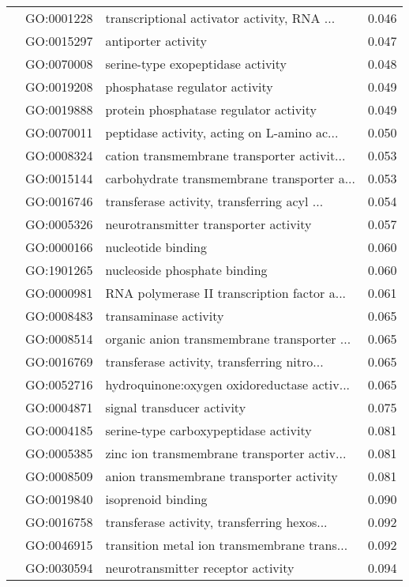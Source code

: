 \begin{longtable}{lllr}
   & GO:0001228 &  transcriptional activator activity, RNA ... &         0.046 \\
   & GO:0015297 &                          antiporter activity &         0.047 \\
   & GO:0070008 &            serine-type exopeptidase activity &         0.048 \\
   & GO:0019208 &               phosphatase regulator activity &         0.049 \\
   & GO:0019888 &       protein phosphatase regulator activity &         0.049 \\
   & GO:0070011 &  peptidase activity, acting on L-amino ac... &         0.050 \\
   & GO:0008324 &  cation transmembrane transporter activit... &         0.053 \\
   & GO:0015144 &  carbohydrate transmembrane transporter a... &         0.053 \\
   & GO:0016746 &  transferase activity, transferring acyl ... &         0.054 \\
   & GO:0005326 &        neurotransmitter transporter activity &         0.057 \\
   & GO:0000166 &                           nucleotide binding &         0.060 \\
   & GO:1901265 &                 nucleoside phosphate binding &         0.060 \\
   & GO:0000981 &  RNA polymerase II transcription factor a... &         0.061 \\
   & GO:0008483 &                        transaminase activity &         0.065 \\
   & GO:0008514 &  organic anion transmembrane transporter ... &         0.065 \\
   & GO:0016769 &  transferase activity, transferring nitro... &         0.065 \\
   & GO:0052716 &  hydroquinone:oxygen oxidoreductase activ... &         0.065 \\
   & GO:0004871 &                   signal transducer activity &         0.075 \\
   & GO:0004185 &        serine-type carboxypeptidase activity &         0.081 \\
   & GO:0005385 &  zinc ion transmembrane transporter activ... &         0.081 \\
   & GO:0008509 &     anion transmembrane transporter activity &         0.081 \\
   & GO:0019840 &                           isoprenoid binding &         0.090 \\
   & GO:0016758 &  transferase activity, transferring hexos... &         0.092 \\
   & GO:0046915 &  transition metal ion transmembrane trans... &         0.092 \\
   & GO:0030594 &           neurotransmitter receptor activity &         0.094 \\
\end{longtable}
